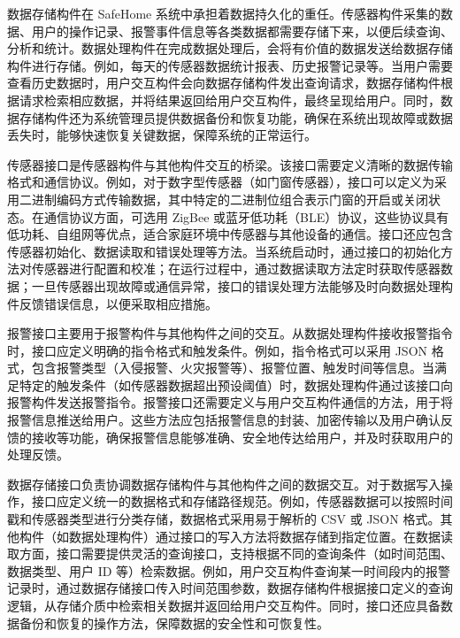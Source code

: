 
数据存储构件在 SafeHome 系统中承担着数据持久化的重任。传感器构件采集的数据、用户的操作记录、报警事件信息等各类数据都需要存储下来，以便后续查询、分析和统计。数据处理构件在完成数据处理后，会将有价值的数据发送给数据存储构件进行存储。例如，每天的传感器数据统计报表、历史报警记录等。当用户需要查看历史数据时，用户交互构件会向数据存储构件发出查询请求，数据存储构件根据请求检索相应数据，并将结果返回给用户交互构件，最终呈现给用户。同时，数据存储构件还为系统管理员提供数据备份和恢复功能，确保在系统出现故障或数据丢失时，能够快速恢复关键数据，保障系统的正常运行。



传感器接口是传感器构件与其他构件交互的桥梁。该接口需要定义清晰的数据传输格式和通信协议。例如，对于数字型传感器（如门窗传感器），接口可以定义为采用二进制编码方式传输数据，其中特定的二进制位组合表示门窗的开启或关闭状态。在通信协议方面，可选用 ZigBee 或蓝牙低功耗（BLE）协议，这些协议具有低功耗、自组网等优点，适合家庭环境中传感器与其他设备的通信。接口还应包含传感器初始化、数据读取和错误处理等方法。当系统启动时，通过接口的初始化方法对传感器进行配置和校准；在运行过程中，通过数据读取方法定时获取传感器数据；一旦传感器出现故障或通信异常，接口的错误处理方法能够及时向数据处理构件反馈错误信息，以便采取相应措施。


报警接口主要用于报警构件与其他构件之间的交互。从数据处理构件接收报警指令时，接口应定义明确的指令格式和触发条件。例如，指令格式可以采用 JSON 格式，包含报警类型（入侵报警、火灾报警等）、报警位置、触发时间等信息。当满足特定的触发条件（如传感器数据超出预设阈值）时，数据处理构件通过该接口向报警构件发送报警指令。报警接口还需要定义与用户交互构件通信的方法，用于将报警信息推送给用户。这些方法应包括报警信息的封装、加密传输以及用户确认反馈的接收等功能，确保报警信息能够准确、安全地传达给用户，并及时获取用户的处理反馈。


数据存储接口负责协调数据存储构件与其他构件之间的数据交互。对于数据写入操作，接口应定义统一的数据格式和存储路径规范。例如，传感器数据可以按照时间戳和传感器类型进行分类存储，数据格式采用易于解析的 CSV 或 JSON 格式。其他构件（如数据处理构件）通过接口的写入方法将数据存储到指定位置。在数据读取方面，接口需要提供灵活的查询接口，支持根据不同的查询条件（如时间范围、数据类型、用户 ID 等）检索数据。例如，用户交互构件查询某一时间段内的报警记录时，通过数据存储接口传入时间范围参数，数据存储构件根据接口定义的查询逻辑，从存储介质中检索相关数据并返回给用户交互构件。同时，接口还应具备数据备份和恢复的操作方法，保障数据的安全性和可恢复性。

